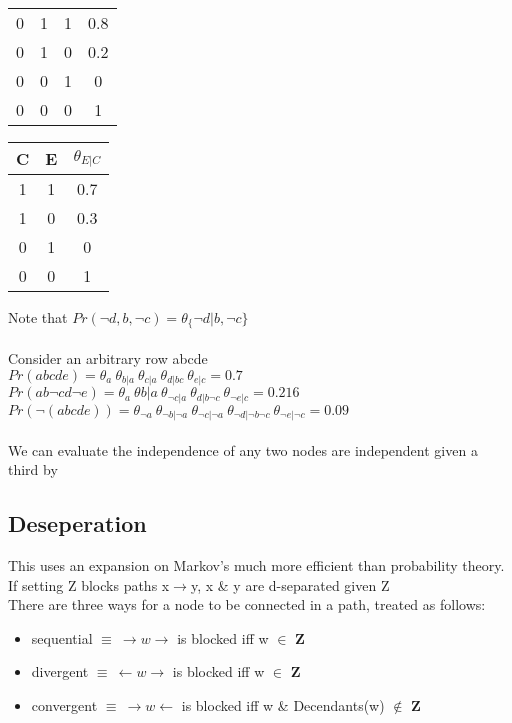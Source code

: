 \documentclass[../../lecture_notes.tex]{subfiles}
\begin{document}
\begin{center}
\begin{tabular} { | c c c | c | }
	0 & 1 & 1 & 0.8 \\
	0 & 1 & 0 & 0.2 \\
	0 & 0 & 1 & 0 \\
	0 & 0 & 0 & 1
\\\hline\end{tabular}
\begin{tabular} { | c c | c | } \hline
	C & E & $\theta_{E|C}$ \\\hline 
	1 & 1 & 0.7 \\
	1 & 0 & 0.3 \\
	0 & 1 & 0 \\
	0 & 0 & 1
\\\hline\end{tabular}\end{center}

\noindent Note that $Pr(\neg d, b, \neg c) = \theta_\{\neg d | b, \neg c\}$\\
\\
Consider an arbitrary row abcde \\ 
\indent $Pr(abcde) =\theta_a\ \theta_{b|a}\ \theta_{c|a}\ \theta_{d|bc}\ \theta_{e|c} = 0.7$\\
\indent $Pr(ab\neg cd\neg e) =\theta_{a}\ \theta{b|a}\ \theta_{\neg c|a}\ \theta_{d|b\neg c}\ \theta_{\neg e|c} = 0.216$\\
\indent $Pr(\neg(abcde)) = \theta_{\neg a}\ \theta_{\neg b|\neg a}\ \theta_{\neg c|\neg a}\
	\theta_{\neg d|\neg b\neg c}\ \theta_{\neg e|\neg c} = 0.09$\\
\\
We can evaluate the independence of any two nodes are independent given a third by
\subsection*{Deseperation}
\noindent This uses an expansion on Markov’s much more efficient than probability theory.\\
If setting Z blocks paths x$\rightarrow$y, x \& y are d-separated given Z\\
There are three ways for a node to be connected in a path, treated as follows:
\begin{itemize} [itemsep=0mm]
	\item sequential $\equiv\ \rightarrow w \rightarrow$ is blocked iff w $\in$ \textbf{Z}
	\item divergent $\equiv\ \leftarrow w \rightarrow$ is blocked iff w $\in$ \textbf{Z}
	\item convergent $\equiv\ \rightarrow w \leftarrow$ is blocked iff w \& Decendants(w) $\notin$ \textbf{Z}
\end{itemize}
\end{document}
